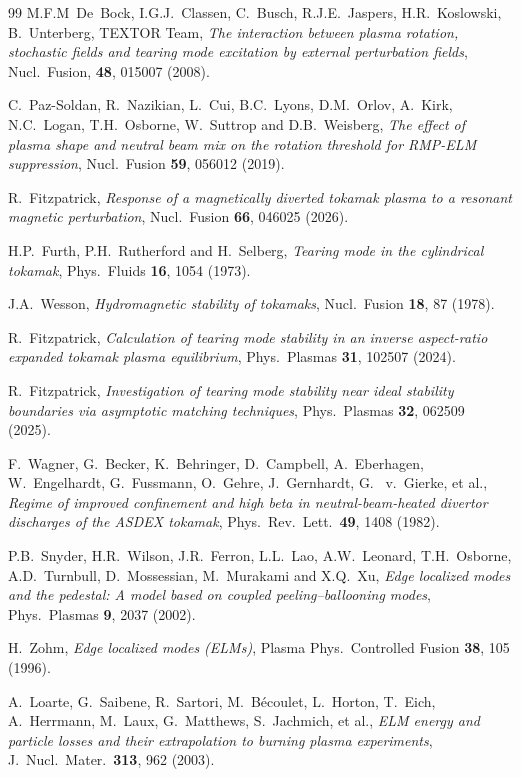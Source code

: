 \documentclass[12pt,prb,aps]{revtex4-1}
\begin{document}
\begin{thebibliography}{99}
 M.F.M~De~Bock, I.G.J.~Classen, C.~Busch, R.J.E.~Jaspers, H.R.~Koslowski, B.~Unterberg, TEXTOR Team,
{\em The interaction between plasma rotation, stochastic fields and tearing mode excitation
 by external perturbation fields}, Nucl.\ Fusion, {\bf 48}, 015007 (2008).

 C.~Paz-Soldan, R.~Nazikian, L.~Cui, B.C.~Lyons, D.M.~Orlov, A.~Kirk,  N.C.~Logan, T.H.~Osborne, W.~Suttrop and D.B.~Weisberg, 
{\em The effect of plasma shape and neutral beam mix on the rotation threshold for RMP-ELM suppression}, Nucl.\ Fusion {\bf 59}, 056012 (2019).

 R.~Fitzpatrick, {\em Response of a magnetically diverted tokamak plasma to a resonant magnetic perturbation},  Nucl.\ Fusion {\bf 66}, 046025 (2026).

 H.P.~Furth, P.H.~Rutherford and H.~Selberg, {\em Tearing mode in the cylindrical tokamak}, Phys.\  Fluids {\bf 16}, 1054 (1973). 

 J.A.~Wesson, {\em Hydromagnetic stability of tokamaks}, Nucl.\ Fusion {\bf 18}, 87 (1978).

 R.~Fitzpatrick, {\em Calculation of tearing mode stability in an inverse aspect-ratio expanded tokamak plasma equilibrium}, Phys.\ Plasmas {\bf 31}, 102507 (2024).

 R.~Fitzpatrick, {\em Investigation of tearing mode stability near ideal stability boundaries via asymptotic matching techniques}, Phys.\ Plasmas {\bf 32}, 062509 (2025).

 F.~Wagner, G.~Becker, K.~Behringer, D.~Campbell, A.~Eberhagen, W.~Engelhardt, G.~Fussmann, O.~Gehre, J.~Gernhardt, G.~ v.~Gierke, et al.,
{\em Regime of improved confinement and high beta in neutral-beam-heated divertor discharges of the ASDEX tokamak}, Phys.\ Rev.\ Lett.\ {\bf 49}, 1408   (1982).

 P.B.~Snyder, H.R.~Wilson, J.R.~Ferron, L.L.~Lao, A.W.~Leonard, T.H.~Osborne, A.D.~Turnbull, D.~Mossessian, M.~Murakami and
 X.Q.~Xu, {\em Edge localized modes and the pedestal: A model based on coupled peeling–ballooning modes}, Phys.\ Plasmas {\bf 9}, 2037 (2002).  
  
 H.~Zohm, {\em Edge localized modes (ELMs)}, Plasma Phys.\ Controlled Fusion {\bf 38}, 105 (1996).

 A.~Loarte, G.~Saibene, R.~Sartori, M.~B\'{e}coulet, L.~Horton, T.~Eich, 
A.~Herrmann, M.~Laux, G.~Matthews, S.~Jachmich, et al., {\em ELM energy and particle losses and their extrapolation to burning plasma experiments}, J.\ Nucl.\ Mater.\ {\bf 313}, 962 (2003).


\end{thebibliography}
\end{document}
